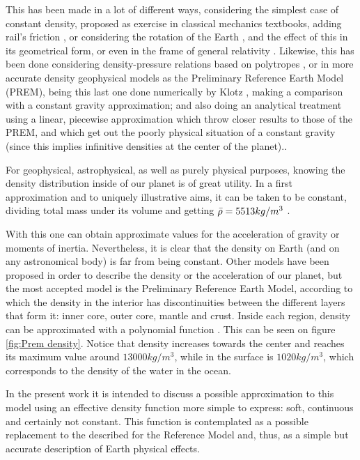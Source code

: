 \documentclass[aps,twocolumn,showpacs,preprintnumbers]{revtex4}
\begin{document}
    This has been made in a lot of different ways, considering the simplest case of constant density\citep{Venezian}, proposed as exercise in classical mechanics  textbooks\cite{Goldstein}, adding rail's friction \citep{Tunel-friccioon}, or considering the rotation of the Earth \citep{Solomon2, Iserman2, Simonic}, and the effect of this in its geometrical form\citep{Taillet2018}, or even in the frame of general relativity \citep{Parker2017, Seel}. Likewise, this has been done considering density-pressure relations based on polytropes \citep{Tunel-Potencia, Politropes2}, or in more accurate density geophysical models as the Preliminary Reference Earth Model (PREM), being this last one done numerically by Klotz \citep{gravity-train-prem},
    making a comparison with a constant gravity approximation; and also doing an analytical treatment using a linear, piecewise approximation which throw closer results to those of the PREM, and which get out the poorly physical situation of a constant gravity  (since this implies infinitive densities at the center of the planet).\citep{gravity-train-prem-approx, Iserman2}. 

    For geophysical, astrophysical, as well as purely physical purposes, knowing the density distribution inside of our planet is of great utility. In a first approximation and to uniquely illustrative aims, it can be taken to be constant, dividing total mass under its volume and getting $\Bar{\rho}=5513kg/m^3$ \citep{AstronomicalConstants}.
    
    With this one can obtain approximate values for the acceleration of gravity or moments of inertia. Nevertheless, it is clear that the density on Earth (and on any astronomical body) is far from being constant. Other models have been proposed in order to describe the density \citep{Snyder1985} or the acceleration \citep{Dragoni2020} of our planet, but the most accepted model is the Preliminary Reference Earth Model, according to which the density in the interior has discontinuities between the different layers that form it: inner core, outer core, mantle and crust. Inside each region, density can be approximated with a polynomial function\citep{PREM} . This can be seen on figure \ref{fig:Prem density}. Notice that density increases towards the center and reaches its maximum value around $ 13000kg/m^3$, while in the surface is $1020kg/m^3$, which corresponds to the density of the water in the ocean.
    
    In the present work it is intended to discuss a possible approximation to this model using an effective density function more simple to express: soft, continuous and certainly not constant.  This function is contemplated as a possible replacement to the described for the Reference Model and, thus, as a simple but accurate description of Earth physical effects.
    
\end{document}
